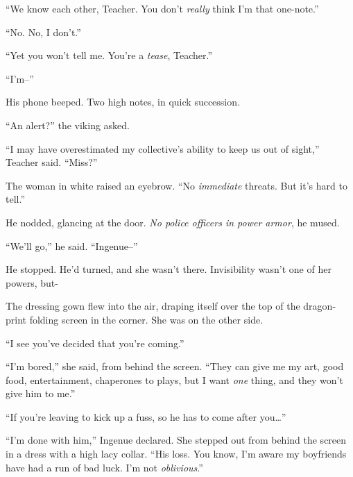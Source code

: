``We know each other, Teacher.  You don't \emph{really} think I'm that one-note.''



``No.  No, I don't.''



``Yet you won't tell me.  You're a \emph{tease}, Teacher.''



``I'm--''



His phone beeped.  Two high notes, in quick succession.



``An alert?'' the viking asked.



``I may have overestimated my collective's ability to keep us out of sight,'' Teacher said.  ``Miss?''



The woman in white raised an eyebrow.  ``No \emph{immediate} threats.  But it's hard to tell.''



He nodded, glancing at the door.  \emph{No police officers in power armor}, he mused.



``We'll go,'' he said.  ``Ingenue--''



He stopped.  He'd turned, and she wasn't there.  Invisibility wasn't one of her powers, but-



The dressing gown flew into the air, draping itself over the top of the dragon-print folding screen in the corner.  She was on the other side.



``I see you've decided that you're coming.''



``I'm bored,'' she said, from behind the screen.  ``They can give me my art, good food, entertainment, chaperones to plays, but I want \emph{one} thing, and they won't give him to me.''



``If you're leaving to kick up a fuss, so he has to come after you\ldots''



``I'm done with him,'' Ingenue declared.  She stepped out from behind the screen in a dress with a high lacy collar.  ``His loss.  You know, I'm aware my boyfriends have had a run of bad luck.  I'm not \emph{oblivious}.''



